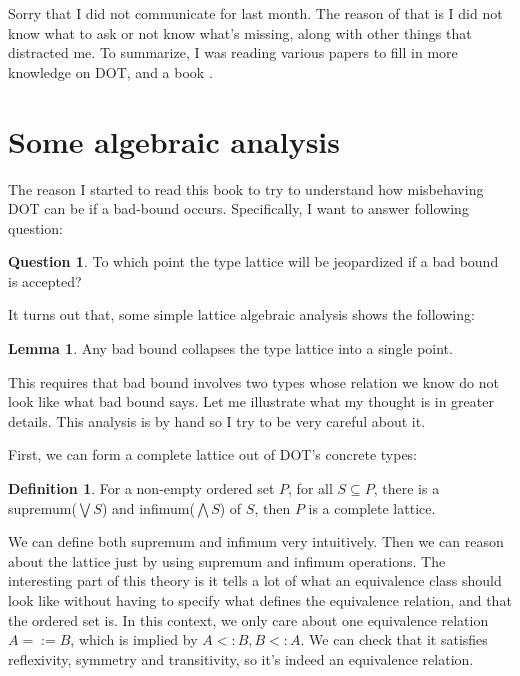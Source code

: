 \documentclass{article}
\theoremstyle{definition}
\newtheorem{question}{Question}
\newtheorem{lemma}{Lemma}
\newtheorem{definition}{Definition}
\begin{document}

Sorry that I did not communicate for last month.  The reason of that is I did not know
what to ask or not know what's missing, along with other things that distracted me.
To summarize, I was reading various papers to fill in more knowledge on DOT, and a
book \cite{lattice}.


\section{Some algebraic analysis}

The reason I started to read this book to try to understand how misbehaving DOT can be
if a bad-bound occurs. Specifically, I want to answer following question:

\begin{question}
To which point the type lattice will be jeopardized if a bad bound is accepted?
\end{question}

It turns out that, some simple lattice algebraic analysis shows the following:

\begin{lemma}
  \label{lem:collapse} Any bad bound collapses the type lattice into a single point.
\end{lemma}

This requires that bad bound involves two types whose relation we know do not look
like what bad bound says. Let me illustrate what my thought is in greater
details. This analysis is by hand so I try to be very careful about it.

First, we can form a complete lattice out of DOT's concrete types:

\begin{definition}
  \cite[2.4]{lattice} For a non-empty ordered set $P$, for all $S \subseteq P$, there
  is a supremum($\bigvee S$) and infimum($\bigwedge S$) of $S$, then $P$ is a complete
  lattice.
\end{definition}

We can define both supremum and infimum very intuitively. Then we can reason about the
lattice just by using supremum and infimum operations. The interesting part of this
theory is it tells a lot of what an equivalence class should look like without having
to specify what defines the equivalence relation, and that the ordered set is. In this
context, we only care about one equivalence relation $A =:= B$, which is implied by
$A <: B, B <: A$. We can check that it satisfies reflexivity, symmetry and
transitivity, so it's indeed an equivalence relation.
\end{document}
